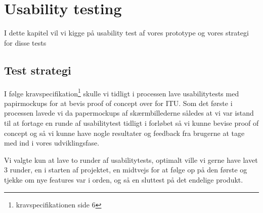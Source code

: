 \chapter{Usability testing}
I dette kapitel vil vi kigge på usability test af vores prototype og vores strategi for disse tests
\section{Test strategi}
I følge kravspecifikation\footnote{kravspecifikationen side 6} skulle vi tidligt i processen lave usabilitytests med papirmockups for at bevis proof of concept over for ITU. Som det første i processen lavede vi da papermockups af skærmbillederne således at vi var istand til at 
fortage en runde af usabilitytest tidligt i forløbet så vi kunne bevise proof of concept og så vi kunne have nogle resultater og feedback fra brugerne at tage med ind i vores udviklingsfase.

Vi valgte kun at lave to runder af usabilitytests, optimalt ville vi gerne have lavet 3 runder, en i starten af projektet, en midtvejs for at følge op på den første og tjekke om nye features var i orden, og så en sluttest på det endelige produkt.

